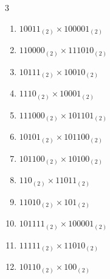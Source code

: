 \begin{multicols}{3}
\begin{enumerate}

  \item $10011_{(2)} \times 100001_{(2)}$


  \item $110000_{(2)} \times 111010_{(2)}$


  \item $10111_{(2)} \times 10010_{(2)}$


  \item $1110_{(2)} \times 10001_{(2)}$


\columnbreak %

  \item $111000_{(2)} \times 101101_{(2)}$


  \item $10101_{(2)} \times 101100_{(2)}$


  \item $101100_{(2)} \times 10100_{(2)}$


  \item $110_{(2)} \times 11011_{(2)}$


  \item $11010_{(2)} \times 101_{(2)}$


\columnbreak %

  \item $101111_{(2)} \times 100001_{(2)}$


  \item $11111_{(2)} \times 11010_{(2)}$


  \item $10110_{(2)} \times 100_{(2)}$



\end{enumerate}
\end{multicols}
